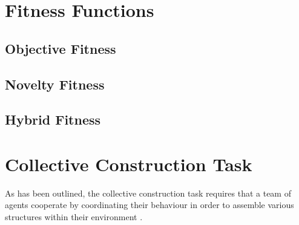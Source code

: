 \section{Fitness Functions}

\subsection{Objective Fitness}



\subsection{Novelty Fitness}
\subsection{Hybrid Fitness}




\section{Collective Construction Task}

As has been outlined, the collective construction task requires that a team of agents cooperate by coordinating their behaviour in order to assemble various structures within their environment \cite{NitschkeSaEC2012}.

